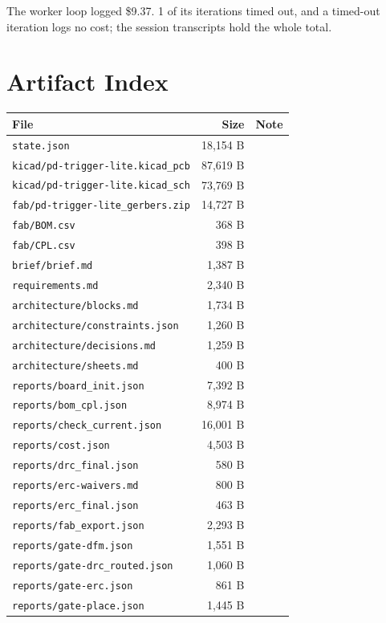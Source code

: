 \documentclass[11pt,a4paper]{article}
\begin{document}
The worker loop logged \$9.37. 1 of its iterations timed out, and a timed-out iteration logs no cost; the session transcripts hold the whole total.

\section{Artifact Index}
{\small
\begin{longtable}{p{9cm}rp{4cm}}
\toprule
\textbf{File} & \textbf{Size} & \textbf{Note} \\
\midrule
\endhead
\texttt{state.json} & 18,154 B &  \\
\texttt{kicad/pd-trigger-lite.kicad\_pcb} & 87,619 B &  \\
\texttt{kicad/pd-trigger-lite.kicad\_sch} & 73,769 B &  \\
\texttt{fab/pd-trigger-lite\_gerbers.zip} & 14,727 B &  \\
\texttt{fab/BOM.csv} & 368 B &  \\
\texttt{fab/CPL.csv} & 398 B &  \\
\texttt{brief/brief.md} & 1,387 B &  \\
\texttt{requirements.md} & 2,340 B &  \\
\texttt{architecture/blocks.md} & 1,734 B &  \\
\texttt{architecture/constraints.json} & 1,260 B &  \\
\texttt{architecture/decisions.md} & 1,259 B &  \\
\texttt{architecture/sheets.md} & 400 B &  \\
\texttt{reports/board\_init.json} & 7,392 B &  \\
\texttt{reports/bom\_cpl.json} & 8,974 B &  \\
\texttt{reports/check\_current.json} & 16,001 B &  \\
\texttt{reports/cost.json} & 4,503 B &  \\
\texttt{reports/drc\_final.json} & 580 B &  \\
\texttt{reports/erc-waivers.md} & 800 B &  \\
\texttt{reports/erc\_final.json} & 463 B &  \\
\texttt{reports/fab\_export.json} & 2,293 B &  \\
\texttt{reports/gate-dfm.json} & 1,551 B &  \\
\texttt{reports/gate-drc\_routed.json} & 1,060 B &  \\
\texttt{reports/gate-erc.json} & 861 B &  \\
\texttt{reports/gate-place.json} & 1,445 B &  \\

\end{longtable}}
\end{document}
